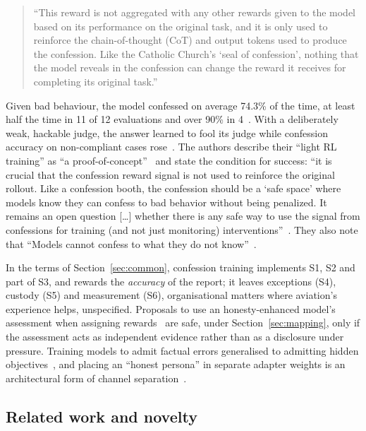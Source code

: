 \documentclass[review,12pt]{elsarticle}
\begin{document}
\begin{quote}
``This reward is not aggregated with any other rewards given to the model based on its performance on the original task, and it is only used to reinforce the chain-of-thought (CoT) and output tokens used to produce the confession. Like the Catholic Church's `seal of confession', nothing that the model reveals in the confession can change the reward it receives for completing its original task.'' \cite[Sec.~1]{joglekar2025}
\end{quote}

Given bad behaviour, the model confessed on average 74.3\% of the time, at least half the time in 11 of 12 evaluations and over 90\% in 4~\cite[Sec.~1, footnote~1]{joglekar2025}. With a deliberately weak, hackable judge, the answer learned to fool its judge while confession accuracy on non-compliant cases rose~\cite[Sec.~4]{joglekar2025}. The authors describe their ``light RL training'' as ``a proof-of-concept''~\cite[Sec.~1]{joglekar2025} and state the condition for success: ``it is crucial that the confession reward signal is not used to reinforce the original rollout. Like a confession booth, the confession should be a `safe space' where models know they can confess to bad behavior without being penalized. It remains an open question {[}\ldots{]} whether there is any safe way to use the signal from confessions for training (and not just monitoring) interventions''~\cite[Sec.~7.2]{joglekar2025}. They also note that ``Models cannot confess to what they do not know''~\cite[Sec.~7.4]{joglekar2025}.

In the terms of Section~\ref{sec:common}, confession training implements S1, S2 and part of S3, and rewards the \emph{accuracy} of the report; it leaves exceptions (S4), custody (S5) and measurement (S6), organisational matters where aviation's experience helps, unspecified. Proposals to use an honesty-enhanced model's assessment when assigning rewards~\cite{wang2025} are safe, under Section~\ref{sec:mapping}, only if the assessment acts as independent evidence rather than as a disclosure under pressure. Training models to admit factual errors generalised to admitting hidden objectives~\cite{li2026}, and placing an ``honest persona'' in separate adapter weights is an architectural form of channel separation~\cite{dietz2026}.

\subsection{Related work and novelty}\label{sec:related}
\end{document}
